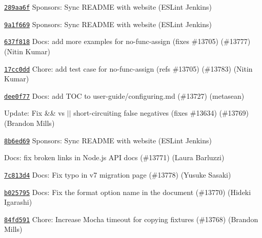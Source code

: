 \begin{DoxyItemize}
\item \href{https://github.com/eslint/eslint/commit/289aa6fcef3874ba5f86455f9302dc4209ea83e5}{\texttt{ {\ttfamily 289aa6f}}} Sponsors\+: Sync README with website (ESLint Jenkins)
\item \href{https://github.com/eslint/eslint/commit/9a1f6694e59eb3e584d4c5a98b98675c895a9783}{\texttt{ {\ttfamily 9a1f669}}} Sponsors\+: Sync README with website (ESLint Jenkins)
\item \href{https://github.com/eslint/eslint/commit/637f8187404ded600fb3d4013b3cd495d5ae675b}{\texttt{ {\ttfamily 637f818}}} Docs\+: add more examples for no-\/func-\/assign (fixes \#13705) (\#13777) (Nitin Kumar)
\item \href{https://github.com/eslint/eslint/commit/17cc0dd9b5d2d500359c36881cd3e5637443c133}{\texttt{ {\ttfamily 17cc0dd}}} Chore\+: add test case for no-\/func-\/assign (refs \#13705) (\#13783) (Nitin Kumar)
\item \href{https://github.com/eslint/eslint/commit/dee0f7764a1d5a323c89b22c4db94acee2b3c718}{\texttt{ {\ttfamily dee0f77}}} Docs\+: add TOC to user-\/guide/configuring.\+md (\#13727) (metasean)
\item \href{https://github.com/eslint/eslint/commit/05106212985cb1ffa1e6fa996a57f6fd2fc3c970}{\texttt{ {}}} Update\+: Fix \&\& vs \texorpdfstring{$\vert$}{|}\texorpdfstring{$\vert$}{|} short-\/circuiting false negatives (fixes \#13634) (\#13769) (Brandon Mills)
\item \href{https://github.com/eslint/eslint/commit/8b6ed691c48189b7d096339441a78cb5874d4137}{\texttt{ {\ttfamily 8b6ed69}}} Sponsors\+: Sync README with website (ESLint Jenkins)
\item \href{https://github.com/eslint/eslint/commit/145750991b04fd4cfb3fff3c5d4211a4428e011c}{\texttt{ {}}} Docs\+: fix broken links in Node.\+js API docs (\#13771) (Laura Barluzzi)
\item \href{https://github.com/eslint/eslint/commit/7c813d458f9aedf7a94351d137728a4647542879}{\texttt{ {\ttfamily 7c813d4}}} Docs\+: Fix typo in v7 migration page (\#13778) (Yusuke Sasaki)
\item \href{https://github.com/eslint/eslint/commit/b0257953be704d0bb387fc15afd7859fd6f19ba5}{\texttt{ {\ttfamily b025795}}} Docs\+: Fix the format option name in the document (\#13770) (Hideki Igarashi)
\item \href{https://github.com/eslint/eslint/commit/84fd591c234accc41bb5af555f178825012fd35d}{\texttt{ {\ttfamily 84fd591}}} Chore\+: Increase Mocha timeout for copying fixtures (\#13768) (Brandon Mills)

\end{DoxyItemize}
